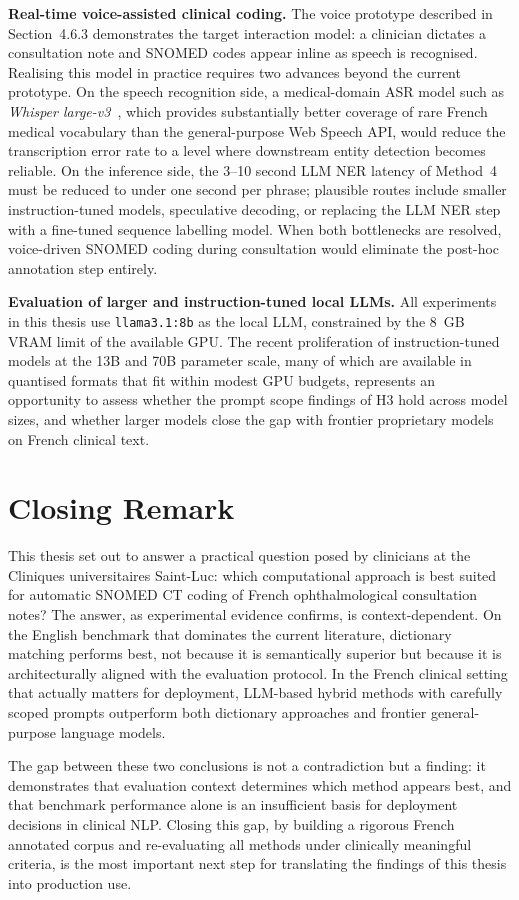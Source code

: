\textbf{Real-time voice-assisted clinical coding.} The voice prototype described in Section~4.6.3 demonstrates the target interaction model: a clinician dictates a consultation note and SNOMED codes appear inline as speech is recognised. Realising this model in practice requires two advances beyond the current prototype. On the speech recognition side, a medical-domain ASR model such as \textit{Whisper large-v3}~\cite{Radford:2023}, which provides substantially better coverage of rare French medical vocabulary than the general-purpose Web Speech API, would reduce the transcription error rate to a level where downstream entity detection becomes reliable. On the inference side, the 3--10 second LLM NER latency of Method~4 must be reduced to under one second per phrase; plausible routes include smaller instruction-tuned models, speculative decoding, or replacing the LLM NER step with a fine-tuned sequence labelling model. When both bottlenecks are resolved, voice-driven SNOMED coding during consultation would eliminate the post-hoc annotation step entirely.

\textbf{Evaluation of larger and instruction-tuned local LLMs.} All experiments in this thesis use \texttt{llama3.1:8b} as the local LLM, constrained by the 8~GB VRAM limit of the available GPU. The recent proliferation of instruction-tuned models at the 13B and 70B parameter scale, many of which are available in quantised formats that fit within modest GPU budgets, represents an opportunity to assess whether the prompt scope findings of H3 hold across model sizes, and whether larger models close the gap with frontier proprietary models on French clinical text.

\section{Closing Remark}

This thesis set out to answer a practical question posed by clinicians at the Cliniques universitaires Saint-Luc: which computational approach is best suited for automatic SNOMED CT coding of French ophthalmological consultation notes? The answer, as experimental evidence confirms, is context-dependent. On the English benchmark that dominates the current literature, dictionary matching performs best, not because it is semantically superior but because it is architecturally aligned with the evaluation protocol. In the French clinical setting that actually matters for deployment, LLM-based hybrid methods with carefully scoped prompts outperform both dictionary approaches and frontier general-purpose language models.

The gap between these two conclusions is not a contradiction but a finding: it demonstrates that evaluation context determines which method appears best, and that benchmark performance alone is an insufficient basis for deployment decisions in clinical NLP. Closing this gap, by building a rigorous French annotated corpus and re-evaluating all methods under clinically meaningful criteria, is the most important next step for translating the findings of this thesis into production use.
